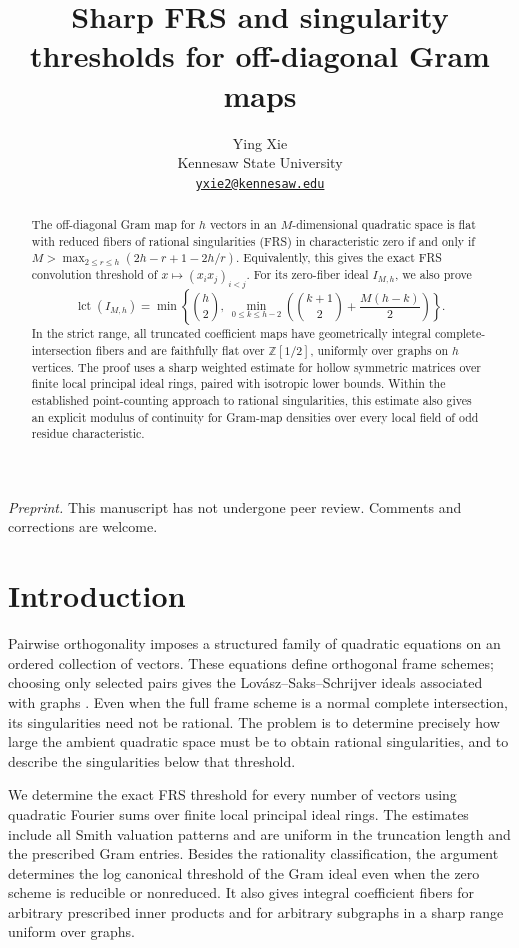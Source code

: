 \documentclass[11pt]{article}
\title{Sharp FRS and singularity thresholds for off-diagonal Gram maps}
\author{Ying Xie\\Kennesaw State University\\
  \href{mailto:yxie2@kennesaw.edu}{\texttt{yxie2@kennesaw.edu}}}
\date{}
\numberwithin{equation}{section}
\theoremstyle{remark}
\newcommand{\Z}{\mathbb Z}
\newcommand{\lct}{\operatorname{lct}}
\begin{document}
\maketitle
\begin{abstract}
The off-diagonal Gram map for $h$ vectors in an $M$-dimensional quadratic
space is flat with reduced fibers of rational singularities (FRS) in
characteristic zero if and only if
$M>\max_{2\le r\le h}(2h-r+1-2h/r)$.
Equivalently, this gives the exact FRS convolution threshold of
$x\mapsto(x_ix_j)_{i<j}$. For its zero-fiber ideal $I_{M,h}$, we also prove
\[
\lct(I_{M,h})=\min\left\{\binom h2,\
 \min_{0\le k\le h-2}\left(\binom{k+1}{2}+\frac{M(h-k)}2\right)\right\}.
\]
In the strict range, all truncated coefficient maps have geometrically
integral complete-intersection fibers and are faithfully flat over
$\Z[1/2]$, uniformly over graphs on $h$ vertices. The proof uses a sharp
weighted estimate for hollow symmetric matrices over finite local
principal ideal rings, paired with isotropic lower bounds. Within the
established point-counting approach to rational singularities, this
estimate also gives an explicit modulus of continuity for Gram-map
densities over every local field of odd residue characteristic.
\end{abstract}

\noindent\textit{Preprint.} This manuscript has not undergone peer review.
Comments and corrections are welcome.

\section{Introduction}
Pairwise orthogonality imposes a structured family of quadratic equations
on an ordered collection of vectors. These equations define orthogonal
frame schemes; choosing only selected pairs gives the
Lov\'asz--Saks--Schrijver ideals associated with graphs
\cite{LSS,CW}. Even when the
full frame scheme is a normal complete intersection, its singularities
need not be rational. The problem is to determine precisely how large
the ambient quadratic space must be to obtain rational singularities,
and to describe the singularities below that threshold.

We determine the exact FRS threshold for every number of vectors
using quadratic Fourier sums over finite local principal ideal rings.
The estimates include all Smith valuation patterns and are uniform
in the truncation length and the prescribed Gram entries. Besides the rationality
classification, the argument determines the log canonical threshold of the Gram
ideal even when the zero scheme is reducible or nonreduced. It also gives
integral coefficient fibers for arbitrary prescribed inner products and
for arbitrary subgraphs in a sharp range uniform over graphs.
\end{document}
